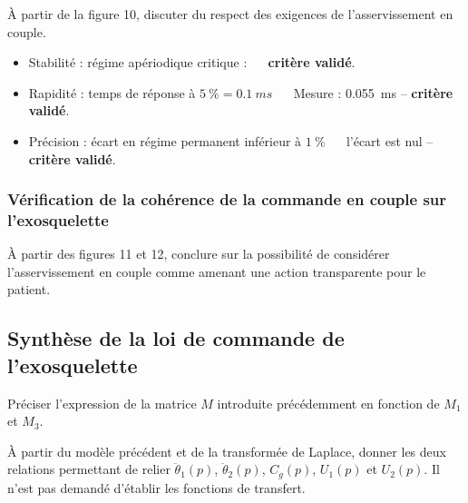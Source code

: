 \documentclass[11pt]{article}
\begin{document}

\UPSTIquestion À partir de la figure 10, discuter du respect des exigences de l'asservissement en couple.
\begin{UPSTIcorrige}
\begin{itemize}
\item Stabilité : régime apériodique critique : $\quad$ \textbf{critère validé}.
\item Rapidité : temps de réponse à $\SI{5}{\%} =\SI{0,1}{ms}$ $\quad$ Mesure : \SI{0,055}{ms} --  \textbf{critère validé}.
\item Précision : écart en régime permanent inférieur à $\SI{1}{\%}$ $\quad$ l'écart est nul -- \textbf{critère validé}.
\end{itemize}
\end{UPSTIcorrige}

\subsubsection{Vérification de la cohérence de la commande en couple sur l’exosquelette}

\UPSTIquestion À partir des figures 11 et 12, conclure sur la possibilité de considérer l'asservissement en couple comme amenant une action transparente pour le patient.
\begin{UPSTIcorrige}

\end{UPSTIcorrige}

\subsection{Synthèse de la loi de commande de l'exosquelette}

\begin{UPSTIcorrige}

\end{UPSTIcorrige}

\UPSTIquestion Préciser l'expression de la matrice $M$ introduite précédemment en fonction de $M_{1}$ et $M_{3}$.
\begin{UPSTIcorrige}

\end{UPSTIcorrige}


\UPSTIquestion À partir du modèle précédent et de la transformée de Laplace, donner les deux relations permettant de relier $\ddot{\theta}_1(p)$, $\ddot{\theta}_2(p)$, $C_g(p)$, $U_1(p)$ et $U_2(p)$. Il n’est pas demandé d’établir les fonctions de transfert.
\end{document}
